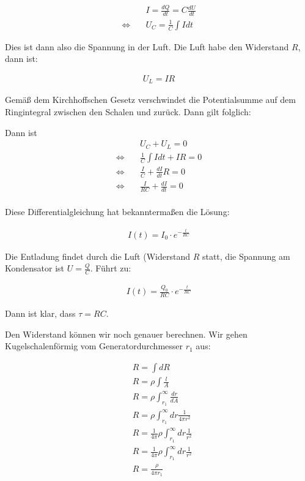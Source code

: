 \documentclass[a4paper,german,12pt,smallheadings]{scrartcl}
\begin{document}
\begin{align*}
  &I = \frac{dQ}{dt} = C \frac{dU}{dt} \\
  \Leftrightarrow\quad &U_C = \frac{1}{C} \int I dt
\end{align*}

Dies ist dann also die Spannung in der Luft. Die Luft habe den Widerstand $R$, dann ist:

\begin{align*}
  U_L = IR
\end{align*}

Gemäß dem Kirchhoffschen Gesetz verschwindet die Potentialsumme auf dem
Ringintegral zwischen den Schalen und zurück. Dann gilt folglich:

Dann ist
\begin{align*}
  &U_C + U_L = 0 \\
  \Leftrightarrow\quad &\frac{1}{C} \int I dt + IR = 0 \\
  \Leftrightarrow\quad &\frac{I}{C} + \frac{dI}{dt} R = 0 \\
  \Leftrightarrow\quad &\frac{I}{RC} + \frac{dI}{dt} = 0 \\
\end{align*}

Diese Differentialgleichung hat bekanntermaßen die Lösung:

\begin{align*}
  I(t) = I_0 \cdot e^{-\frac{t}{RC}}
\end{align*}

Die Entladung findet durch die Luft (Widerstand $R$ statt, die Spannung am
Kondensator ist $U = \frac{Q}{C}$. Führt zu:

\begin{align*}
  I(t) = \frac{Q_0}{RC} \cdot e^{-\frac{t}{RC}}
\end{align*}

Dann ist klar, dass $\tau = RC$.

Den Widerstand können wir noch genauer berechnen. Wir gehen Kugelschalenförmig vom Generatordurchmesser $r_1$ aus:

\begin{align*}
  &R = \int dR \\
  &R = \rho \int \frac{l}{A} \\
  &R = \rho \int_{r_1}^\infty \frac{dr}{dA} \\
  &R = \rho \int_{r_1}^\infty dr \frac{1}{4 \pi r^2} \\
  &R = \frac{1}{4 \pi}\rho \int_{r_1}^\infty dr \frac{1}{r^2} \\
  &R = \frac{1}{4 \pi}\rho \int_{r_1}^\infty dr \frac{1}{r^2} \\
  &R = \frac{\rho}{4 \pi r_1}
\end{align*}
\end{document}
